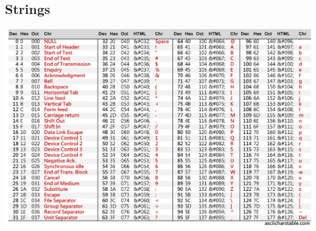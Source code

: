 \documentclass[10pt, twocolumn]{article}
\begin{document}
\begin{flushleft}
\section{Strings}

\begin{center}
\includegraphics[scale=0.122]{ASCII-Table-wide.jpg}
\end{center}




\end{flushleft}
\end{document}
